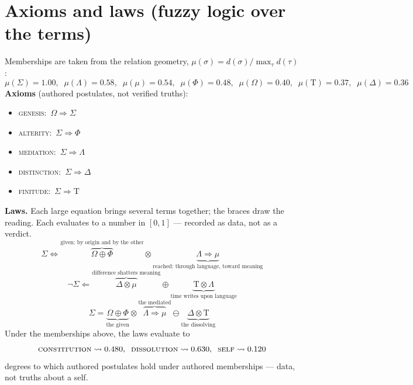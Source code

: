 \documentclass[11pt]{article}
\newcommand{\Tau}{\mathrm{T}}
\begin{document}
\section*{Axioms and laws (fuzzy logic over the terms)}
Memberships are taken from the relation geometry, $\mu(\sigma)=d(\sigma)/\max_\tau d(\tau)$:\begin{equation*}\mu(\Sigma){=}1.00,\;\; \mu(\Lambda){=}0.58,\;\; \mu(\mu){=}0.54,\;\; \mu(\Phi){=}0.48,\;\; \mu(\Omega){=}0.40,\;\; \mu(\Tau){=}0.37,\;\; \mu(\Delta){=}0.36\end{equation*}
\noindent\textbf{Axioms} (authored postulates, not verified truths):\begin{itemize}\item \textsc{genesis}: $\,\Omega \Rightarrow \Sigma\,$\item \textsc{alterity}: $\,\Sigma \Rightarrow \Phi\,$\item \textsc{mediation}: $\,\Sigma \Rightarrow \Lambda\,$\item \textsc{distinction}: $\,\Sigma \Rightarrow \Delta\,$\item \textsc{finitude}: $\,\Sigma \Rightarrow \Tau\,$\end{itemize}
\noindent\textbf{Laws.} Each large equation brings several terms together; the braces draw the reading. Each evaluates to a number in $[0,1]$ --- recorded as data, not as a verdict.
\begin{equation*}\Sigma \Longleftrightarrow \overbrace{\Omega \oplus \Phi}^{\text{given: by origin and by the other}} \otimes \underbrace{\Lambda \Rightarrow \mu}_{\text{reached: through language, toward meaning}}\end{equation*}
\begin{equation*}\neg \Sigma \Longleftarrow \overbrace{\Delta \otimes \mu}^{\text{difference shatters meaning}} \oplus \underbrace{\Tau \otimes \Lambda}_{\text{time writes upon language}}\end{equation*}
\begin{equation*}\Sigma = \underbrace{\Omega \oplus \Phi}_{\text{the given}} \otimes \overbrace{\Lambda \Rightarrow \mu}^{\text{the mediated}} \ominus \underbrace{\Delta \otimes \Tau}_{\text{the dissolving}}\end{equation*}
Under the memberships above, the laws evaluate to\begin{equation*}\textsc{constitution}\rightsquigarrow 0.480,\;\; \textsc{dissolution}\rightsquigarrow 0.630,\;\; \textsc{self}\rightsquigarrow 0.120\end{equation*}\noindent degrees to which authored postulates hold under authored memberships --- data, not truths about a self.
\end{document}
